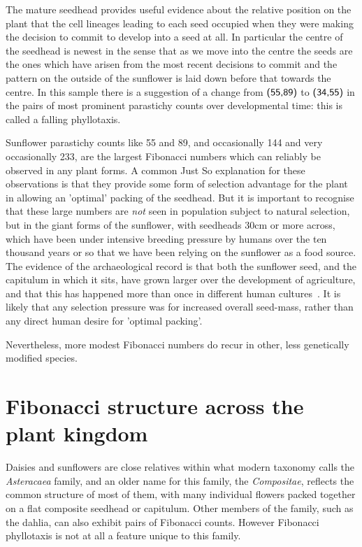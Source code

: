   The mature seedhead provides useful evidence about the relative position on the plant that the cell lineages leading to each seed occupied when they were making the decision to commit to develop into a seed at all. In particular the centre of the seedhead is newest in the sense that as we move into the centre the seeds are the ones which have arisen from the most recent decisions to commit and the pattern on the outside of the sunflower is laid down before that towards the centre.  In this sample there is a suggestion of a change from $\textsf{(55,89)}$ to $\textsf{(34,55)}$ in the pairs of most prominent parastichy counts over developmental time: this is called a falling phyllotaxis. 

Sunflower parastichy counts like 55 and 89, and occasionally 144 and very occasionally 233, are the largest Fibonacci numbers which can reliably be observed in any plant forms. A common Just So explanation for these observations is that they provide some form of selection advantage for the plant in allowing an 'optimal' packing of the seedhead. But it is important to recognise that these large numbers are \textit{not} seen in population subject to natural selection, but in the giant forms of the sunflower, with seedheads 30cm or more across, which have been under intensive breeding pressure by humans over the ten thousand years or so that we have been relying on the sunflower as a food source. 
The evidence of the archaeological record is that both
 the sunflower seed, and the capitulum in which it sits, have grown larger over the development of agriculture, and that this has happened more than once in different human cultures~\cite{lentzSunflowerHelianthusAnnuus2008,burkeGeneticAnalysisSunflower2002}. It is likely that any selection pressure was for increased overall seed-mass, rather than any direct human desire for 'optimal packing'. 

Nevertheless, more modest Fibonacci numbers do recur in other, less genetically modified species. 
\clearpage
\section{Fibonacci structure across the plant kingdom}
 Daisies and sunflowers are close relatives within what modern taxonomy calls the \textit{Asteracaea} family,  and an older name for this family, the \textit{Compositae}, reflects the common structure of most of them, with many individual flowers packed together on a flat composite seedhead or capitulum. Other members of the family, such as the dahlia, can also exhibit pairs of Fibonacci counts.
However Fibonacci phyllotaxis is not at all a feature unique to this family.

